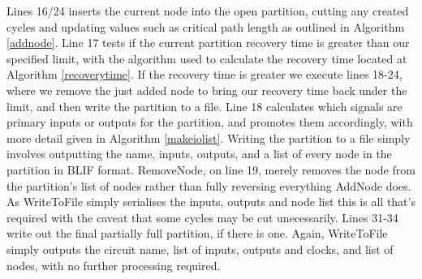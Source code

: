 \documentclass[12pt,final,oneside]{article} %
\begin{document}
Lines 16/24 inserts the current node into the open partition, cutting any created cycles and updating values such as critical path length as outlined in Algorithm \ref{addnode}.
Line 17 tests if the current partition recovery time is greater than our specified limit, with the algorithm used to calculate the recovery time located at Algorithm \ref{recoverytime}.
If the recovery time is greater we execute lines 18-24, where we remove the just added node to bring our recovery time back under the limit, and then write the partition to a file.
Line 18 calculates which signals are primary inputs or outputs for the partition, and promotes them accordingly, with more detail given in Algorithm \ref{makeiolist}.
Writing the partition to a file simply involves outputting the name, inputs, outputs, and a list of every node in the partition in \ac{BLIF} format.
RemoveNode, on line 19, merely removes the node from the partition's list of nodes rather than fully reversing everything AddNode does. As WriteToFile simply serialises the inputs, outputs and node list this is all that's required with the caveat that some cycles may be cut unecessarily.
Lines 31-34 write out the final partially full partition, if there is one. Again, WriteToFile simply outputs the circuit name, list of inputs, outputs and clocks, and list of nodes, with no further processing required.


\newpage
\end{document}
